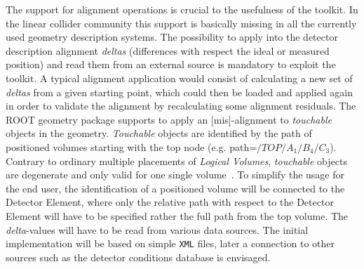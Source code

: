The support for alignment operations is crucial to the usefulness of the toolkit. In the linear collider community this support is basically missing  in all the currently used geometry description systems. The possibility to apply into the detector description alignment \textit{deltas}  (differences with respect the ideal or measured position) and read them from an external source is mandatory to exploit the toolkit. A typical alignment application would consist of calculating a new set of \textit{deltas} from a given starting point, which could then be loaded and applied again in order to validate the alignment by recalculating some alignment residuals. The ROOT geometry package supports to apply an [mis]-alignment to \textit{touchable} objects in the geometry. \textit{Touchable} objects are identified by the path of positioned volumes starting with the top node (e.g. path=\texttt{$/TOP/A_1/B_4/C_3$}). Contrary to ordinary multiple placements of \textit{Logical Volumes}, \textit{touchable} objects are degenerate and only valid for one single volume~\cite{Brun2003676}. To simplify the usage for the end user, the identification of a positioned volume will be connected to the Detector Element, where only the relative path with respect to the Detector Element will have to be specified rather the full path from the top volume. The \textit{delta}-values will have to be read from various data sources. The initial implementation will be based on simple \texttt{XML} files, later a connection to other sources such as the detector conditions database is envisaged.

